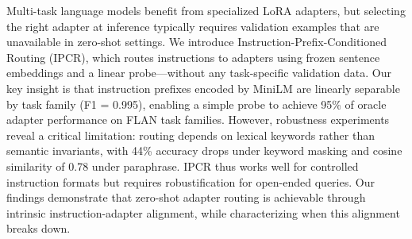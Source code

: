 Multi-task language models benefit from specialized LoRA adapters, but selecting the right adapter at inference typically requires validation examples that are unavailable in zero-shot settings. We introduce Instruction-Prefix-Conditioned Routing (IPCR), which routes instructions to adapters using frozen sentence embeddings and a linear probe---without any task-specific validation data. Our key insight is that instruction prefixes encoded by MiniLM are linearly separable by task family (F1 = 0.995), enabling a simple probe to achieve 95\% of oracle adapter performance on FLAN task families. However, robustness experiments reveal a critical limitation: routing depends on lexical keywords rather than semantic invariants, with 44\% accuracy drops under keyword masking and cosine similarity of 0.78 under paraphrase. IPCR thus works well for controlled instruction formats but requires robustification for open-ended queries. Our findings demonstrate that zero-shot adapter routing is achievable through intrinsic instruction-adapter alignment, while characterizing when this alignment breaks down.
